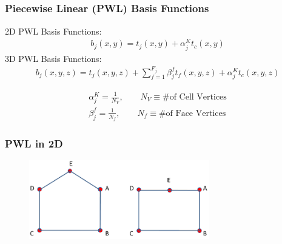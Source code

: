 \documentclass[]{beamer}
\begin{document}
\subsection{}
\begin{frame}[t]\frametitle{Piecewise Linear (PWL) Basis Functions}
    \begin{block}{}{\small
	2D PWL Basis Functions:
       	\begin{align*}
			b_j (x,y) = t_j (x,y) + \alpha_j^K t_c (x,y)
     		\end{align*} 
	3D PWL Basis Functions:
       	\begin{align*}
			b_j (x,y,z)  = t_j  (x,y,z) + \sum_{f=1}^{F_j} \beta_j^f  t_f (x,y,z) + \alpha_j^K t_c  (x,y,z)
     		\end{align*} }
     \end{block}
	\begin{block}{}
{\small
		\begin{align*}
			\alpha_j^K = \frac{1}{N_V}, \qquad N_V \equiv \text{\# of Cell Vertices}\\
			\beta_j^f = \frac{1}{N_f}, \qquad N_f \equiv \text{\# of Face Vertices}
		\end{align*}
}
	\end{block}
\end{frame}
\begin{frame}[t]\frametitle{PWL in 2D}
    \begin{figure}[t]
		\centering \vfill
		\includegraphics[width=0.7\textwidth]{images/pentagon_verts.png}
		\vfill
	\end{figure}
\end{frame}
\end{document}
